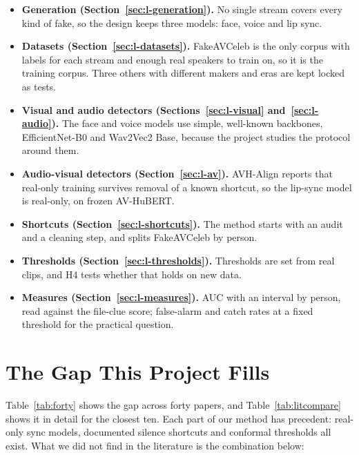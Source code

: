 \begin{itemize}
    \item \textbf{Generation (Section~\ref{sec:l-generation}).} No single
    stream covers every kind of fake, so the design keeps three models: face,
    voice and lip sync.
    \item \textbf{Datasets (Section~\ref{sec:l-datasets}).} FakeAVCeleb is the
    only corpus with labels for each stream and enough real speakers to train
    on, so it is the training corpus. Three others with different makers and
    eras are kept locked as tests.
    \item \textbf{Visual and audio detectors (Sections~\ref{sec:l-visual}
    and~\ref{sec:l-audio}).} The face and voice models use simple, well-known
    backbones, EfficientNet-B0 and Wav2Vec2 Base, because the project studies
    the protocol around them.
    \item \textbf{Audio-visual detectors (Section~\ref{sec:l-av}).} AVH-Align
    reports that real-only training survives removal of a known shortcut, so
    the lip-sync model is real-only, on frozen AV-HuBERT.
    \item \textbf{Shortcuts (Section~\ref{sec:l-shortcuts}).} The method starts
    with an audit and a cleaning step, and splits FakeAVCeleb by person.
    \item \textbf{Thresholds (Section~\ref{sec:l-thresholds}).} Thresholds are
    set from real clips, and H4 tests whether that holds on new data.
    \item \textbf{Measures (Section~\ref{sec:l-measures}).} AUC with an
    interval by person, read against the file-clue score; false-alarm and
    catch rates at a fixed threshold for the practical question.
\end{itemize}

\section{The Gap This Project Fills}

Table~\ref{tab:forty} shows the gap across forty papers, and
Table~\ref{tab:litcompare} shows it in detail for the closest ten. Each part of
our method has precedent: real-only sync models, documented silence shortcuts
and conformal thresholds all exist. What we did not find in
the literature is the combination below:

